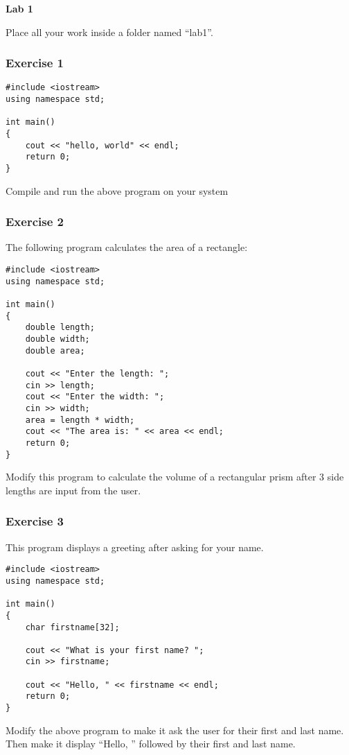 \documentclass[a4paper,12pt]{article}
\begin{document}
\lstset{frame=single,basicstyle=\ttfamily,tabsize=4}

{\centering
\large \bf
Lab 1
}

Place all your work inside a folder named ``lab1''.

\subsubsection*{Exercise 1}
\begin{lstlisting}[caption=hello.cpp]
#include <iostream>
using namespace std;

int main()
{
	cout << "hello, world" << endl;
	return 0;
}
\end{lstlisting}
Compile and run the above program on your system

\subsubsection*{Exercise 2}
The following program calculates the area of a rectangle:
\begin{lstlisting}[caption=area.cpp]
#include <iostream>
using namespace std;

int main()
{
	double length;
	double width;
	double area;

	cout << "Enter the length: ";
	cin >> length;
	cout << "Enter the width: ";
	cin >> width;
	area = length * width;
	cout << "The area is: " << area << endl;
	return 0;
}
\end{lstlisting}
Modify this program to calculate the volume of a rectangular prism after 3 side lengths are input from the user.

\subsubsection*{Exercise 3}
This program displays a greeting after asking for your name.
\begin{lstlisting}[caption=name.cpp]
#include <iostream>
using namespace std;

int main()
{
	char firstname[32];

	cout << "What is your first name? ";
	cin >> firstname;
	
	cout << "Hello, " << firstname << endl;
	return 0;
}
\end{lstlisting}
Modify the above program to make it ask the user for their first and last name. Then make it display ``Hello, '' followed by their first and last name.
\end{document}
